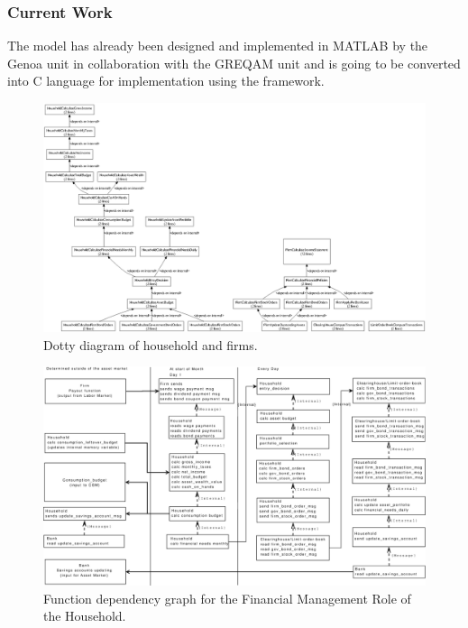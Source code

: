 \documentclass[a4paper,11pt]{article}
\begin{document}
\subsubsection{Current Work}
The model has already been designed and implemented in MATLAB by the
Genoa unit in collaboration with the GREQAM unit and is going to be converted into C language for
implementation using the framework.

\clearpage

\begin{landscape}

\begin{figure}
\begin{center}
\includegraphics*[width = \linewidth]{hh.eps}
\caption{Dotty diagram of household and firms.} \label{fig:hh}
\end{center}
\end{figure}

\begin{figure}
\begin{center}
\includegraphics*[width = \linewidth]{hh1.eps}
\caption{Function dependency graph for the Financial Management Role
of the Household.} \label{fig:hh1}
\end{center}
\end{figure}


\end{landscape}
\end{document}
